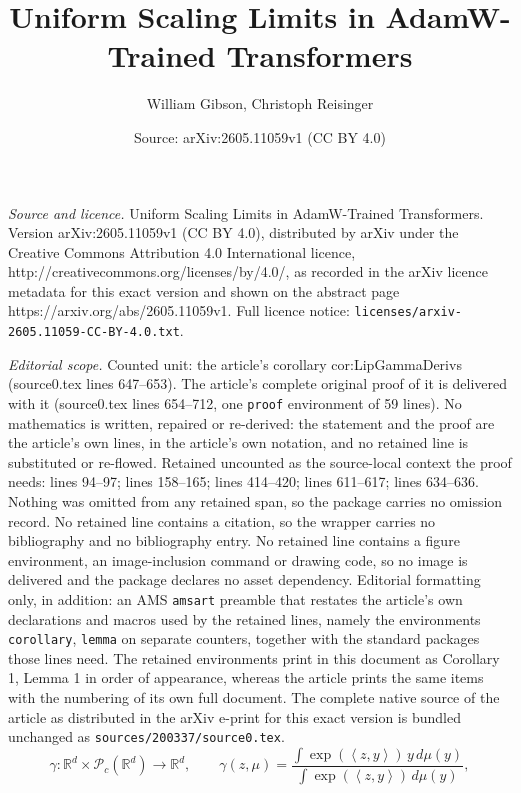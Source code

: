 \documentclass[10pt,a4paper]{amsart}
\title{Uniform Scaling Limits in AdamW-Trained Transformers}
\author{William Gibson, Christoph Reisinger}
\date{Source: arXiv:2605.11059v1 (CC BY 4.0)}
\newcommand{\R}{\mathbb{R}}
\begin{document}
\maketitle

\noindent\emph{Source and licence.} Uniform Scaling Limits in AdamW-Trained Transformers. Version arXiv:2605.11059v1 (CC BY 4.0), distributed by arXiv under the Creative Commons Attribution 4.0 International licence, http://creativecommons.org/licenses/by/4.0/, as recorded in the arXiv licence metadata for this exact version and shown on the abstract page https://arxiv.org/abs/2605.11059v1. Full licence notice: \texttt{licenses/arxiv-2605.11059-CC-BY-4.0.txt}.\par\smallskip

\noindent\textit{Editorial scope.} Counted unit: the article's corollary cor:LipGammaDerivs (source0.tex lines 647--653). The article's complete original proof of it is delivered with it (source0.tex lines 654--712, one \texttt{proof} environment of 59 lines). No mathematics is written, repaired or re-derived: the statement and the proof are the article's own lines, in the article's own notation, and no retained line is substituted or re-flowed.  Retained uncounted as the source-local context the proof needs: lines 94--97; lines 158--165; lines 414--420; lines 611--617; lines 634--636.  Nothing was omitted from any retained span, so the package carries no omission record.  No retained line contains a citation, so the wrapper carries no bibliography and no bibliography entry.  No retained line contains a figure environment, an image-inclusion command or drawing code, so no image is delivered and the package declares no asset dependency.  Editorial formatting only, in addition: an AMS \texttt{amsart} preamble that restates the article's own declarations and macros used by the retained lines, namely the environments \texttt{corollary}, \texttt{lemma} on separate counters, together with the standard packages those lines need.  The retained environments print in this document as Corollary 1, Lemma 1 in order of appearance, whereas the article prints the same items with the numbering of its own full document.  The complete native source of the article as distributed in the arXiv e-print for this exact version is bundled unchanged as \texttt{sources/200337/source0.tex}.
\begin{equation}\label{eqn:gamma}
\gamma : \R^d\times \mathcal P_c(\R^d)\to \R^d, \qquad
    \gamma(z,\mu) = \frac{\int \exp( \left\langle z,  y \right\rangle)\,y\,d\mu(y)}{\int \exp( \left\langle z, y \right\rangle)\,d\mu(y)},
\end{equation}
\end{document}
